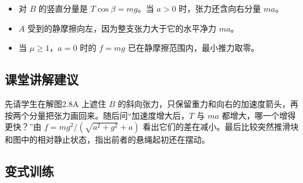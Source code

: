 \documentclass[UTF8,fontset=fandol,a4paper,11pt]{ctexart}
\begin{document}
\begin{itemize}
\item 对 $B$ 的竖直分量是 $T\cos\beta=mg$。当 $a>0$ 时，张力还含向右分量 $ma$。
\item $A$ 受到的静摩擦向左，因为整支张力大于它的水平净力 $ma$。
\item 当 $\mu\geq1$，$a=0$ 时的 $f=mg$ 已在静摩擦范围内，最小推力取零。
\end{itemize}



\subsection*{课堂讲解建议}

先请学生在解图2.8A 上遮住 $B$ 的斜向张力，只保留重力和向右的加速度箭头，再按两个分量把张力画回来。随后问“加速度增大后，$T$ 与 $ma$ 都增大，哪一个增得更快？”由 $f=mg^2/(\sqrt{a^2+g^2}+a)$ 看出它们的差在减小。最后比较突然推滑块和图中的相对静止状态，指出前者的悬绳起初还在摆动。



\subsection*{变式训练}
\end{document}
